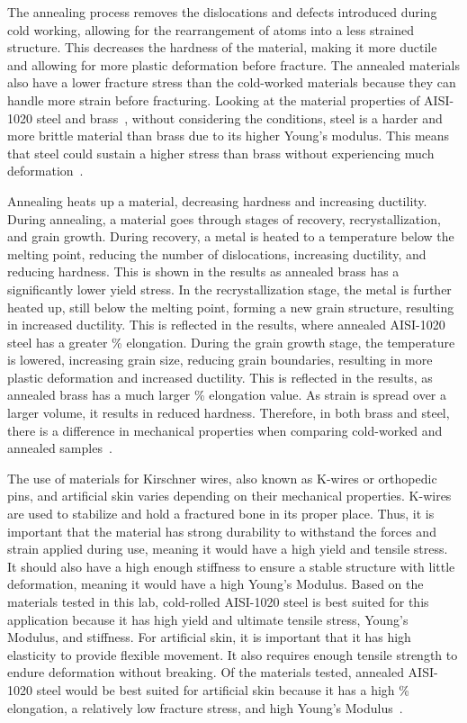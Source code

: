 \documentclass[11pt]{article}
\begin{document}
    The annealing process removes the dislocations and defects introduced during cold working, allowing for the rearrangement of atoms into a less strained structure. 
    This decreases the hardness of the material, making it more ductile and allowing for more plastic deformation before fracture. 
    The annealed materials also have a lower fracture stress than the cold-worked materials because they can handle more strain before fracturing. 
    Looking at the material properties of AISI-1020 steel and brass~\cite{Lin2016}\cite{Xiao2011}\cite{SAE1999}, without considering the conditions, steel is a harder and more brittle material than brass due to its higher Young's modulus. 
    This means that steel could sustain a higher stress than brass without experiencing much deformation~\cite{Douglas2014}.
    
    Annealing heats up a material, decreasing hardness and increasing ductility. 
    During annealing, a material goes through stages of recovery, recrystallization, and grain growth. 
    During recovery, a metal is heated to a temperature below the melting point, reducing the number of dislocations, increasing ductility, and reducing hardness. 
    This is shown in the results as annealed brass has a significantly lower yield stress. 
    In the recrystallization stage, the metal is further heated up, still below the melting point, forming a new grain structure, resulting in increased ductility. 
    This is reflected in the results, where annealed AISI-1020 steel has a greater \% elongation. 
    During the grain growth stage, the temperature is lowered, increasing grain size, reducing grain boundaries, resulting in more plastic deformation and increased ductility. 
    This is reflected in the results, as annealed brass has a much larger \% elongation value. 
    As strain is spread over a larger volume, it results in reduced hardness. 
    Therefore, in both brass and steel, there is a difference in mechanical properties when comparing cold-worked and annealed samples~\cite{Pan2020}.
    
    The use of materials for Kirschner wires, also known as K-wires or orthopedic pins, and artificial skin varies depending on their mechanical properties. 
    K-wires are used to stabilize and hold a fractured bone in its proper place. 
    Thus, it is important that the material has strong durability to withstand the forces and strain applied during use, meaning it would have a high yield and tensile stress. 
    It should also have a high enough stiffness to ensure a stable structure with little deformation, meaning it would have a high Young's Modulus. 
    Based on the materials tested in this lab, cold-rolled AISI-1020 steel is best suited for this application because it has high yield and ultimate tensile stress, Young's Modulus, and stiffness. 
    For artificial skin, it is important that it has high elasticity to provide flexible movement. 
    It also requires enough tensile strength to endure deformation without breaking. 
    Of the materials tested, annealed AISI-1020 steel would be best suited for artificial skin because it has a high \% elongation, a relatively low fracture stress, and high Young's Modulus~\cite{Woodroof2009}.
    
\end{document}
